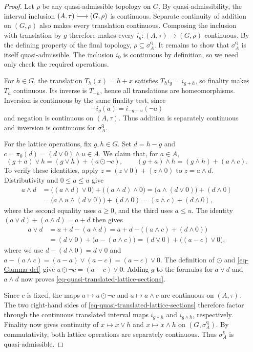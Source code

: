 \documentclass[preprint,3p]{elsarticle}
\theoremstyle{plain}
\theoremstyle{definition}
\newcommand{\longhookrightarrow}{\lhook\joinrel\longrightarrow}
\numberwithin{equation}{section}
\begin{document}
\begin{proof}
Let $\rho$ be any quasi-admissible topology on $G$.
By quasi-admissibility, the interval inclusion
$(A,\tau)\longhookrightarrow(G,\rho)$ is continuous.
Separate continuity of addition on $(G,\rho)$ also makes
every translation continuous.  Composing the inclusion with
translation by $g$ therefore makes every
$i_g\colon(A,\tau)\longrightarrow(G,\rho)$ continuous.
By the defining property of the final topology,
$\rho\subseteq\sigma_A^{\mathrm q}$.
It remains to show that $\sigma_A^{\mathrm q}$ is itself
quasi-admissible.  The inclusion $i_0$ is continuous by
definition, so we need only check the required operations.

For $h\in G$, the translation $T_h(x)=h+x$ satisfies
$T_hi_g=i_{g+h}$, so finality makes $T_h$ continuous.
Its inverse is $T_{-h}$, hence all translations are homeomorphisms.
Inversion is continuous by the same finality test, since
\[
 -i_g(a)=i_{-g-u}(\neg a)
\]
and negation is continuous on $(A,\tau)$.
Thus addition is separately continuous and inversion is continuous
for $\sigma_A^{\mathrm q}$.

For the lattice operations, fix $g,h\in G$.  Set
$d=h-g$ and $c=\pi_0(d)=(d\vee0)\wedge u\in A$.
We claim that, for $a\in A$,
\begin{equation}
\label{eq-quasi-translated-lattice-sections}
 (g+a)\vee h=(g\vee h)+(a\odot\neg c),
 \qquad
 (g+a)\wedge h=(g\wedge h)+(a\wedge c).
\end{equation}
To verify these identities, apply $z=(z\vee0)+(z\wedge0)$
to $z=a\wedge d$.  Distributivity and $0\leq a\leq u$ give
\[
\begin{aligned}
 a\wedge d
 &=\bigl((a\wedge d)\vee0\bigr)
   +\bigl((a\wedge d)\wedge0\bigr)
 =\bigl(a\wedge(d\vee0)\bigr)+(d\wedge0)\\
 &=\bigl(a\wedge u\wedge(d\vee0)\bigr)+(d\wedge0)
 =(a\wedge c)+(d\wedge0),
\end{aligned}
\]
where the second equality uses $a\geq0$, and the third uses $a\leq u$.
The identity $(a\vee d)+(a\wedge d)=a+d$ then gives
\[
\begin{aligned}
 a\vee d
 &=a+d-(a\wedge d)
 =a+d-\bigl((a\wedge c)+(d\wedge0)\bigr)\\
 &=(d\vee0)+\bigl(a-(a\wedge c)\bigr)
 =(d\vee0)+\bigl((a-c)\vee0\bigr),
\end{aligned}
\]
where we use $d-(d\wedge0)=d\vee0$ and
$a-(a\wedge c)=(a-a)\vee(a-c)=(a-c)\vee0$.
The definition of $\odot$ and \eqref{eq-Gamma-def} give
$a\odot\neg c=(a-c)\vee0$.
Adding $g$ to the formulas for $a\vee d$ and $a\wedge d$ now proves
\eqref{eq-quasi-translated-lattice-sections}.

Since $c$ is fixed, the maps $a\mapsto a\odot\neg c$ and
$a\mapsto a\wedge c$ are continuous on $(A,\tau)$.
The two right-hand sides of
\eqref{eq-quasi-translated-lattice-sections} therefore factor
through the continuous translated interval maps $i_{g\vee h}$
and $i_{g\wedge h}$, respectively.
Finality now gives continuity of $x\mapsto x\vee h$ and
$x\mapsto x\wedge h$ on $(G,\sigma_A^{\mathrm q})$.
By commutativity, both lattice operations are separately continuous.
Thus $\sigma_A^{\mathrm q}$ is quasi-admissible.
\end{proof}
\end{document}
